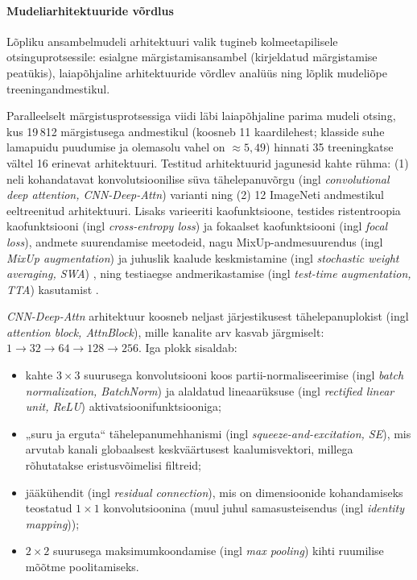     \paragraph{Mudeliarhitektuuride võrdlus} 
    Lõpliku ansambelmudeli arhitektuuri valik tugineb kolmeetapilisele otsinguprotsessile: esialgne märgistamisansambel (kirjeldatud märgistamise peatükis), laiapõhjaline arhitektuuride võrdlev analüüs ning lõplik mudeliõpe treeningandmestikul.
    
    Paralleelselt märgistusprotsessiga viidi läbi laiapõhjaline parima mudeli otsing, kus 19\,812 märgistusega andmestikul (koosneb 11 kaardilehest; klasside suhe lamapuidu puudumise ja olemasolu vahel on $\approx 5{,}49$) hinnati 35 treeningkatse vältel 16 erinevat arhitektuuri. Testitud arhitektuurid jagunesid kahte rühma: (1) neli kohandatavat konvolutsioonilise süva tähelepanuvõrgu (ingl \textit{convolutional deep attention, CNN-Deep-Attn}) varianti ning (2) 12 ImageNeti andmestikul eeltreenitud arhitektuuri. Lisaks varieeriti kaofunktsioone, testides ristentroopia kaofunktsiooni (ingl \textit{cross-entropy loss}) ja fokaalset kaofunktsiooni (ingl \textit{focal loss}), andmete suurendamise meetodeid, nagu MixUp-andmesuurendus (ingl \textit{MixUp augmentation}) \parencite{zhang_mixup_2017} ja juhuslik kaalude keskmistamine (ingl \textit{stochastic weight averaging, SWA}) \parencite{izmailov_averaging_2018}, ning testiaegse andmerikastamise (ingl \textit{test-time augmentation, TTA}) kasutamist \parencite{wang_aleatoric_2019}.
    
    \textit{CNN-Deep-Attn} arhitektuur koosneb neljast järjestikusest tähelepanuplokist (ingl \textit{attention block, AttnBlock}), mille kanalite arv kasvab järgmiselt: $1 \to 32 \to 64 \to 128 \to 256$. Iga plokk sisaldab:
    \begin{itemize}
        \item kahte $3\times3$ suurusega konvolutsiooni koos partii-normaliseerimise (ingl \textit{batch normalization, BatchNorm}) ja alaldatud lineaarüksuse (ingl \textit{rectified linear unit, ReLU}) aktivatsioonifunktsiooniga;
        \item „suru ja erguta“ tähelepanumehhanismi (ingl \textit{squeeze-and-excitation, SE}), mis arvutab kanali globaalsest keskväärtusest kaalumisvektori, millega rõhutatakse eristusvõimelisi filtreid;
        \item jääkühendit (ingl \textit{residual connection}), mis on dimensioonide kohandamiseks teostatud $1\times1$ konvolutsioonina (muul juhul samasusteisendus (ingl \textit{identity mapping}));
        \item $2\times2$ suurusega maksimumkoondamise (ingl \textit{max pooling}) kihti ruumilise mõõtme poolitamiseks.
    \end{itemize}
    
